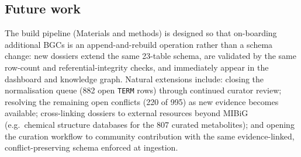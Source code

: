 \subsection{Future work}

The build pipeline (Materials and methods) is designed so that on-boarding additional BGCs is an
append-and-rebuild operation rather than a schema change: new dossiers extend the same 23-table
schema, are validated by the same row-count and referential-integrity checks, and immediately appear
in the dashboard and knowledge graph. Natural extensions include: closing the normalisation queue
(882 open \texttt{TERM} rows) through continued curator review; resolving the remaining open
conflicts (220 of 995) as new evidence becomes available; cross-linking dossiers to external
resources beyond MIBiG (e.g.\ chemical structure databases for the 807 curated metabolites); and
opening the curation workflow to community contribution with the same evidence-linked,
conflict-preserving schema enforced at ingestion.

